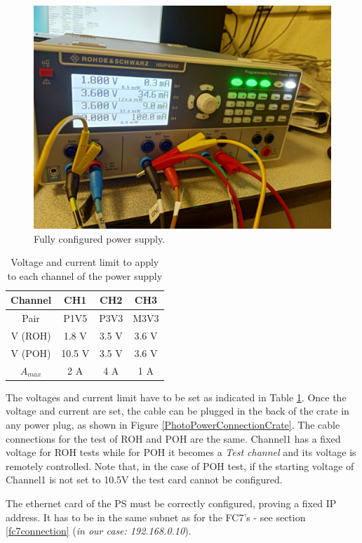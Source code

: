 \documentclass[10pt,a4paper]{article}
\begin{document}
\begin{figure}[h!]
\centering
 \includegraphics[width=0.7\linewidth]{PowerSupply.jpeg} 
  \caption{Fully configured power supply.}
  \label{PhotoPowerConnection}
\end{figure}

\begin{table}[h!]

\centering
\begin{tabular}{|c|c|c|c|}
\hline 
Channel & CH1 & CH2 & CH3 \\ 
\hline 
Pair & P1V5 & P3V3 & M3V3 \\ 
\hline 
V (ROH)& 1.8 V & 3.5 V & 3.6 V \\
V (POH)& 10.5 V & 3.5 V & 3.6 V \\
$A_{max}$ & 2 A & 4 A & 1 A \\ 
\hline 
\end{tabular} 
\caption{Voltage and current limit to apply to each channel of the power supply}
\label{tabella}
\end{table}

The voltages and current limit have to be set as indicated in Table \ref{tabella}. Once the voltage and current are set, the cable can be plugged in the back of the crate in any power plug, as shown in Figure \ref{PhotoPowerConnectionCrate}.
The cable connections for the test of ROH and POH are the same. Channel1 has a fixed voltage for ROH tests while for POH it becomes a {\it Test channel} and its voltage is remotely controlled. Note that, in the case of POH test, if the starting voltage of Channel1 is not set to 10.5V the test card cannot be configured.  
\par The ethernet card of the PS must be correctly configured, proving a fixed IP address. It has to be in the same subnet as for the FC7's - see section \ref{fc7connection} ({\it in our case: 192.168.0.10}).
\end{document}
